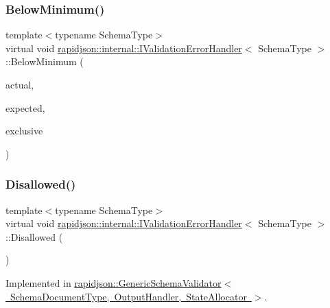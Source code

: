 \subsubsection{\texorpdfstring{BelowMinimum()}{BelowMinimum()}\hspace{0.1cm}{\footnotesize\ttfamily [3/3]}}
{\footnotesize\ttfamily template$<$typename Schema\+Type$>$ \\
virtual void \mbox{\hyperlink{classrapidjson_1_1internal_1_1_i_validation_error_handler}{rapidjson\+::internal\+::\+I\+Validation\+Error\+Handler}}$<$ Schema\+Type $>$\+::Below\+Minimum (\begin{DoxyParamCaption}\item[{double}]{actual,  }\item[{const \mbox{\hyperlink{classrapidjson_1_1internal_1_1_i_validation_error_handler_a8a2aaf7eb28a3ce7ed81689141f3af1f}{S\+Value}} \&}]{expected,  }\item[{bool}]{exclusive }\end{DoxyParamCaption})\hspace{0.3cm}{\ttfamily [pure virtual]}}

\mbox{\label{classrapidjson_1_1internal_1_1_i_validation_error_handler_a25bb8e7b7c68b4556adce6a0b2be3c37}} 
\subsubsection{\texorpdfstring{Disallowed()}{Disallowed()}}
{\footnotesize\ttfamily template$<$typename Schema\+Type$>$ \\
virtual void \mbox{\hyperlink{classrapidjson_1_1internal_1_1_i_validation_error_handler}{rapidjson\+::internal\+::\+I\+Validation\+Error\+Handler}}$<$ Schema\+Type $>$\+::Disallowed (\begin{DoxyParamCaption}{ }\end{DoxyParamCaption})\hspace{0.3cm}{\ttfamily [pure virtual]}}



Implemented in \mbox{\hyperlink{classrapidjson_1_1_generic_schema_validator_a73838d75ed8f38e20f3b6798b4a56db5}{rapidjson\+::\+Generic\+Schema\+Validator$<$ Schema\+Document\+Type, Output\+Handler, State\+Allocator $>$}}.



